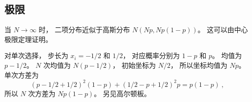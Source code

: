 \subsection{极限}
当 $N\to\infty$ 时， 二项分布近似于高斯分布 $N(Np, Np(1-p))$。 这可以由中心极限定理证明。

对单次选择， 步长为 $x_i = -1/2$ 和 $1/2$， 对应概率分别为 $1-p$ 和 $p$。 均值为 $p - 1/2$。 $N$ 次均值为 $N(p - 1/2)$， 初始坐标为 $N/2$， 所以坐标均值为 $Np$。 单次方差为
\begin{equation}
(p-1/2+1/2)^2(1-p) + (1/2 - p + 1/2)^2 p = p(1-p)~,
\end{equation}
所以 $N$ 次方差为 $Np(1-p)$。 另见高尔顿板。
